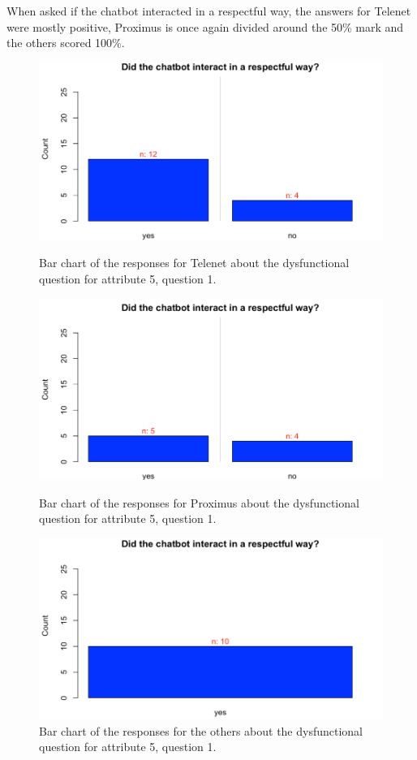\break
When asked if the chatbot interacted in a respectful way, the answers for Telenet were mostly positive, Proximus is once again divided around the 50\% mark and the others scored 100\%.\\
\begin{figure}[!htb]
	\includegraphics[width=\linewidth]{../LaTeX/Figures/Comparative/DQ5T.png}
	\caption{Bar chart of the responses for Telenet about the dysfunctional question for attribute 5, question 1.}\label{fig:DQ5T}
	\endminipage\hfill
	\includegraphics[width=\linewidth]{../LaTeX/Figures/Comparative/DQ5P.png}
	\caption{Bar chart of the responses for Proximus about the dysfunctional question for attribute 5, question 1.}\label{fig:DQ5P}
	\endminipage\hfill
	\includegraphics[width=\linewidth]{../LaTeX/Figures/Comparative/DQ5O.png}
	\caption{Bar chart of the responses for the others about the dysfunctional question for attribute 5, question 1.}\label{fig:DQ5O}
	\endminipage\hfill
\end{figure}
